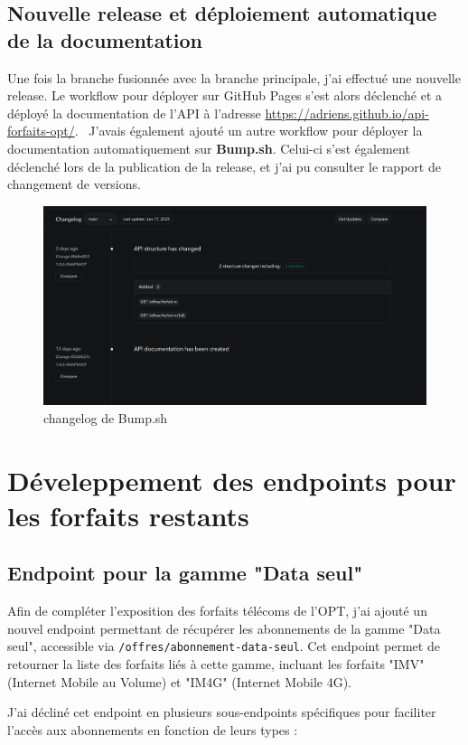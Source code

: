\documentclass[11pt]{article}
\begin{document}
		\subsection*{Nouvelle release et déploiement automatique de la documentation}
		
		Une fois la branche fusionnée avec la branche principale, j'ai effectué une nouvelle release. Le workflow pour déployer sur GitHub Pages s'est alors déclenché et a déployé la documentation de l'API à l'adresse \url{https://adriens.github.io/api-forfaits-opt/}. \ J'avais également ajouté un autre workflow pour déployer la documentation automatiquement sur \textbf{Bump.sh}. Celui-ci s'est également déclenché lors de la publication de la release, et j'ai pu consulter le rapport de changement de versions.
		\begin{figure}[H] \centering \includegraphics[width=\textwidth]{asset/changelog.png} \caption{changelog de Bump.sh} \label{fig:sonarq}\end{figure}
		\section{Déveleppement des endpoints pour les forfaits restants}
		\subsection*{Endpoint pour la gamme "Data seul"}
		
		Afin de compléter l'exposition des forfaits télécoms de l'OPT, j'ai ajouté un nouvel endpoint permettant de récupérer les abonnements de la gamme "Data seul", accessible via \texttt{/offres/abonnement-data-seul}. Cet endpoint permet de retourner la liste des forfaits liés à cette gamme, incluant les forfaits "IMV" (Internet Mobile au Volume) et "IM4G" (Internet Mobile 4G).
		
		J'ai décliné cet endpoint en plusieurs sous-endpoints spécifiques pour faciliter l'accès aux abonnements en fonction de leurs types :
	
\end{document}
